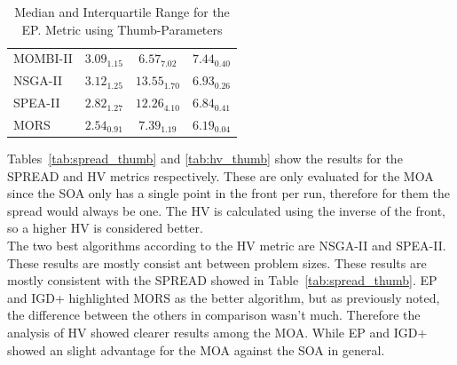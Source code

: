 \begin{table}[!htp]
{\begin{tabular}{@{}lccccccccc@{}}
MOMBI-II & \multicolumn{3}{c}{$3.09_{1.15}$}                   & \multicolumn{3}{c}{\cellcolor{gray95}$6.57_{7.02}$}  & \multicolumn{3}{c}{$7.44_{0.40}$}                   \\
NSGA-II  & \multicolumn{3}{c}{$3.12_{1.25}$}                   & \multicolumn{3}{c}{$13.55_{1.70}$}                   & \multicolumn{3}{c}{$6.93_{0.26}$}                   \\
SPEA-II  & \multicolumn{3}{c}{\cellcolor{gray25}$2.82_{1.27}$} & \multicolumn{3}{c}{$12.26_{4.10}$}                   & \multicolumn{3}{c}{$6.84_{0.41}$}                   \\
MORS     & \multicolumn{3}{c}{\cellcolor{gray95}$2.54_{0.91}$} & \multicolumn{3}{c}{\cellcolor{gray25}$7.39_{1.19}$}  & \multicolumn{3}{c}{\cellcolor{gray95}$6.19_{0.04}$} \\ \bottomrule
\end{tabular}%
}
\caption{Median and Interquartile Range for the EP. Metric using Thumb-Parameters}
\label{tab:ep_thumb}
\end{table}

Tables~\ref{tab:spread_thumb} and \ref{tab:hv_thumb} show the results for the SPREAD and HV metrics respectively. These are only evaluated for the MOA since the SOA only has a single point in the front per run, therefore for them the spread would always be one. The HV is calculated using the inverse of the front, so a higher HV is considered better.\\ 

The two best algorithms according to the HV metric are NSGA-II and SPEA-II. These results are mostly consist ant between problem sizes. These results are mostly consistent with the SPREAD showed in Table~\ref{tab:spread_thumb}. EP and IGD+ highlighted MORS as the better algorithm, but as previously noted, the difference between the others in comparison wasn't much. Therefore the analysis of HV showed clearer results among the MOA. While EP and IGD+ showed an slight advantage for the MOA against the SOA in general.\\
  

